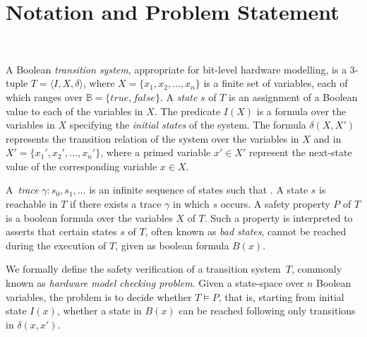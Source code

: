 \section{Notation and Problem Statement}~\label{sec:notation}

A Boolean \textit{transition system}, appropriate for bit-level hardware
modelling, is a 3-tuple $T = \langle I,X,\delta \rangle$, where $X = \{x_1,x_2,\dots ,x_n\}$
is a finite set of variables, each of which ranges over $\mathbb{B} =
\{\mathit{true}, \mathit{false}\}$.  
A \emph{state} $s$ of $T$ is an assignment of a Boolean value to each of the variables in $X$.  
The predicate $I(X)$ is a formula over
the variables in $X$ specifying the \emph{initial states} of the system.
The formula $\delta(X,X')$
represents the transition relation of the system over the variables in $X$ and
in $X' = \{x_1', x_2', \dots, x_n'\}$, where a primed variable $x'\in X'$ represent the next-state value of the corresponding variable $x\in X$.  


A~\emph{trace} $\gamma: s_0,s_1,\dots$ is an infinite sequence
of states such that .  A state $s$ is reachable in $T$ if there exists a trace $\gamma$ in which $s$ occurs.  A safety property $P$ of $T$ is a boolean formula over the
variables $X$ of $T$. Such a property is interpreted  to asserts that certain states $s$ of $T$,
often known as \emph{bad states}, cannot be reached during the execution of $T$, given
as boolean formula $B(x)$. 


We formally define the safety verification of a transition system~$T$,
commonly known as \emph{hardware model checking problem}.  
Given a state-space over $n$ Boolean variables, the problem is to
decide whether $T \models P$, that is, starting from initial state
$I(x)$, whether a state in $B(x)$ can be reached following only
transitions in $\delta(x,x')$.
%
